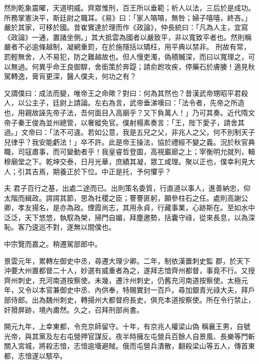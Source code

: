 \begin{pinyinscope}
 然則乾象震曜，天道明威。齊眾惟刑，百王所以垂範；析人以法，三后於是成功。所務掌憲決平，斯廷尉之職耳。《易》曰：「家人嗃嗃，無咎；婦子嘻嘻，終吝。」嚴於其家，可移於國。昔崔實達於理而作《政論》，仲長統曰：「凡為人主，宜寫《政論》一通，置諸坐側。」其大抵雲為國者以嚴致平，非以寬致平者也。然則稱嚴者不必逾條越制，凝網重罰，在於施隱括以矯枉，用平典以禁非。
 刑故有常，罰輕無舍，人不易犯，防之難越故也。但人慢吏濁，偽積贓深，而曰以寬理之，可以無過。何異乎命王良御駻，舍銜策於奔踶；請俞跗攻疾，停藥石於膚腠！適見秋駕轉逸，膏肓更深，醫人僕夫，何功之有？



 又謂僕曰：成法而變，唯帝王之命歟？對曰：何為其然也？昔漢武帝甥昭平君殺人，以公主子，廷尉上請論。左右為言，武帝垂涕嘆曰：「法令者，先帝之所造也，用親故誣先帝子法，吾何面目入高廟乎？又下負萬人！」乃可其奏。近代隋文
 帝子秦王俊為並州總管，以奢縱免官。僕射楊素奏言：「王，陛下愛子，請舍其過。」文帝曰：「法不可違。若如公意，我是五兒之父，非兆人之父，何不別制天子兒律乎？我安能虧法！」卒不許。此是帝王操法，協於禮經不變之義。況於秋官典職，司寇肅事，而可變動者乎！我皇睿哲登圖，高視巖廊之上；宰衡明允就列，輯穆廟堂之下。乾坤交泰，日月光華，庶績其凝，眾工咸理。聚以正也，僕幸利見大人；引其吉焉，期養正於下位。中正是托，予何懼乎？



 夫
 君子百行之基，出處二途而已。出則策名委質，行直道以事人，進善納忠，仰太階而緝政。諤諤其節，思為社稷之臣；謇謇匪躬，願參柱石之任。處則高謝公卿，孝友揚名，是亦為政。煙霞尚志，其用永貞，行藏事業，心跡斯在。至如水中泛泛，天下悠悠，執馭為榮，掃門自媚，拜塵邀勢，括囊守祿，從來長息，以為深恥。客乃逡巡不對，遂無以間僕也。



 中宗覽而嘉之。稍遷駕部郎中。



 景雲元年，累轉左御史中丞，尋遷大理少卿。二年，制依漢置刺史監
 郡，於天下沖要大州置都督二十人，妙選有威重者為之，遂拜志愔齊州都督，事竟不行。又授齊州刺史，充河南道按察使。未幾，遷汴州刺史，仍舊充河南道按察使。太極元年，又令以本官兼御史中丞、內供奉，特賜實封一百戶。尋加銀青光祿大夫，拜戶部侍郎。出為魏州刺史，轉揚州大都督府長史，俱充本道按察使。所在令行禁止，奸猾屏跡，境內肅然。久之，召拜刑部尚書。



 開元九年，上幸東都，令充京師留守。十年，有京兆人權梁山偽
 稱襄王男，自號光帝，與其黨及左右屯營押官謀反。夜半時擁左屯營兵百餘人自景風、長樂等門斬關入宮城，將殺志愔，志愔逾墻避賊。俄而屯營兵潰散，翻殺梁山等五人，傳首東都，志愔遂以駭卒。




\end{pinyinscope}
